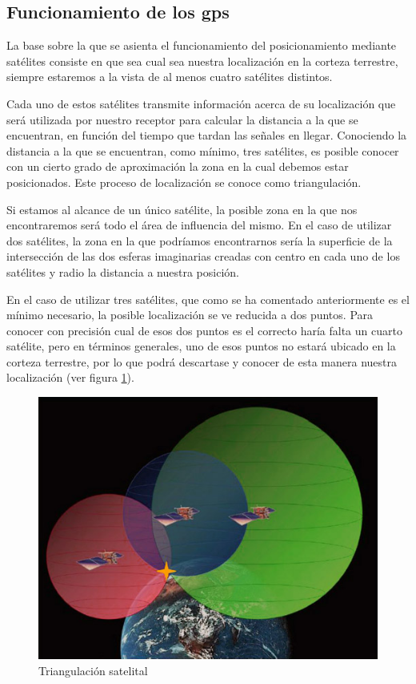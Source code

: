 \subsection{Funcionamiento de los gps}

La base sobre la que se asienta el funcionamiento del posicionamiento mediante satélites consiste en que sea cual sea nuestra localización en la corteza terrestre, siempre estaremos a la vista de al menos cuatro satélites distintos.

Cada uno de estos satélites transmite información acerca de su localización que será utilizada por nuestro receptor para calcular la distancia a la que se encuentran, en función del tiempo que tardan las señales en llegar.
Conociendo la distancia a la que se encuentran, como mínimo, tres satélites, es posible conocer con un cierto grado de aproximación la zona en la cual debemos estar posicionados. Este proceso de localización se conoce como triangulación.

Si estamos al alcance de un único satélite, la posible zona en la que nos encontraremos será todo el área de influencia del mismo. En el caso de utilizar dos satélites, la zona en la que podríamos encontrarnos sería la superficie de la intersección de las dos esferas imaginarias creadas con centro en cada uno de los satélites y radio la distancia a nuestra posición.

En el caso de utilizar tres satélites, que como se ha comentado anteriormente es el mínimo necesario, la posible localización se ve reducida a dos puntos. Para conocer con precisión cual de esos dos puntos es el correcto haría falta un cuarto satélite, pero en términos generales, uno de esos puntos no estará ubicado en la corteza terrestre, por lo que podrá descartase y conocer de esta manera nuestra localización (ver figura \ref{fig:triangulacion-satelital}).

\begin{figure}[h!btp]
\centering
\includegraphics[scale=0.5, fbox={\fboxrule} 0mm]{images/03-antecedentes/31-funcionamiento_gps.jpg}
\caption{Triangulación satelital}
\label{fig:triangulacion-satelital}
\end{figure}

